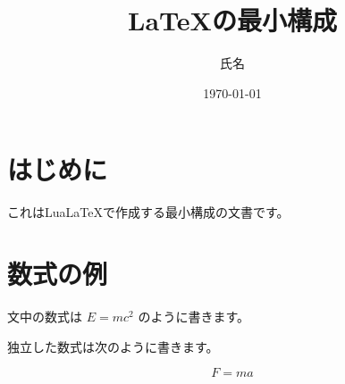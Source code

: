 \documentclass{jlreq}
\title{LaTeXの最小構成}
\author{氏名}
\date{\today}
\begin{document}
\maketitle

\section{はじめに}

これはLuaLaTeXで作成する最小構成の文書です。

\section{数式の例}

文中の数式は $E = mc^2$ のように書きます。

独立した数式は次のように書きます。

\begin{equation}
F = ma
\end{equation}
\end{document}

